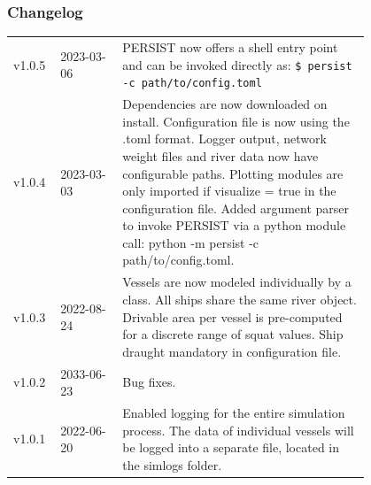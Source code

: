 \documentclass[
	a4paper, %
	12pt, %
]{persist}
\begin{document}
\begin{twothirdswidth}
	\vfill %
	
	\subsubsection*{Changelog}
	
	\scriptsize %
	
	\begin{tabular}{@{} L{0.05\linewidth} L{0.15\linewidth} L{0.6\linewidth} @{}} %
		\toprule
		v1.0.5 & 2023-03-06 & 
		PERSIST now offers a shell entry point and can be invoked directly as: \verb|$ persist -c path/to/config.toml|\\
		v1.0.4 & 2023-03-03 & Dependencies are now downloaded on install. Configuration file is now using the .toml format. Logger output, network weight files and river data now have configurable paths. Plotting modules are only imported if visualize = true in the configuration file. Added argument parser to invoke PERSIST via a python module call: python -m persist -c path/to/config.toml.\\
		v1.0.3 & 2022-08-24 & Vessels are now modeled individually by a class. All ships share the same river object. Drivable area per vessel is pre-computed for a discrete range of squat values. Ship draught mandatory in configuration file.\\
		v1.0.2 & 2033-06-23 & Bug fixes.\\
		v1.0.1 & 2022-06-20 & Enabled logging for the entire simulation process. The data of individual vessels will be logged into a separate file, located in the simlogs folder.\\
		\bottomrule
	\end{tabular}
\end{twothirdswidth}

\newpage


\begin{twothirdswidth} %
	\tableofcontents %
\end{twothirdswidth}
\end{document}
